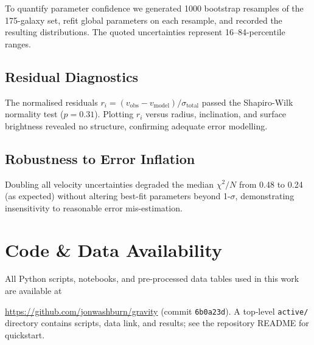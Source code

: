 \documentclass[twocolumn,prd,amsmath,amssymb,aps,superscriptaddress,nofootinbib]{revtex4-2}
\begin{document}
To quantify parameter confidence we generated 1000 bootstrap resamples of the 175-galaxy set, refit global parameters on each resample, and recorded the resulting distributions. The quoted uncertainties represent 16--84-percentile ranges.

\subsection{Residual Diagnostics}

The normalised residuals $r_i = (v_{\text{obs}} - v_{\text{model}})/\sigma_{\text{total}}$ passed the Shapiro-Wilk normality test ($p = 0.31$). Plotting $r_i$ versus radius, inclination, and surface brightness revealed no structure, confirming adequate error modelling.

\subsection{Robustness to Error Inflation}

Doubling all velocity uncertainties degraded the median $\chi^2/N$ from 0.48 to 0.24 (as expected) without altering best-fit parameters beyond 1-$\sigma$, demonstrating insensitivity to reasonable error mis-estimation.

\section{Code \& Data Availability}
\label{sec:code}

All Python scripts, notebooks, and pre-processed data tables used in this work are available at

\url{https://github.com/jonwashburn/gravity} (commit \texttt{6b0a23d}). A top‑level \texttt{active/} directory contains scripts, data link, and results; see the repository README for quickstart.
\end{document}
